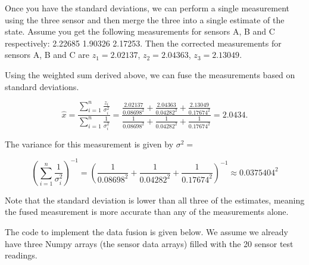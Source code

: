 Once you have the standard deviations, we can perform a single
measurement using the three sensor and then merge the three into a
single estimate of the state. Assume you get the following measurements
for sensors A, B and C respectively: 2.22685 1.90326 2.17253. Then the
corrected measurements for sensors A, B and C are \(z_1 = 2.02137\),
\(z_2 =  2.04363\), \(z_3 =  2.13049\).

Using the weighted sum derived above, we can fuse the measurements based
on standard deviations.

\[\hat{x} = \displaystyle \frac{\displaystyle \sum_{i=1}^n \frac{z_i}{\sigma_i^2}}{\displaystyle
\sum_{i=1}^n \frac{1}{\sigma_i^2}} =
\displaystyle \frac{\displaystyle  \frac{ 2.02137}{0.08698^2} + \frac{2.04363}{0.04282^2}    + \frac{2.13049}{0.17674^2}  }{\displaystyle
 \frac{ 1}{0.08698^2} + \frac{1}{0.04282^2}    + \frac{1}{0.17674^2}  } = 2.0434 .\]

The variance for this measurement is given by \(\sigma^2 =\)

\[\left(\displaystyle\sum_{i=1}^n \displaystyle \frac{1}{\sigma_i^2}\right)^{-1}
 = \left( {\displaystyle
 \frac{ 1}{0.08698^2} + \frac{1}{0.04282^2}    + \frac{1}{0.17674^2}  } \right)^{-1}
 \approx 0.0375404^2\]

Note that the standard deviation is lower than all three of the
estimates, meaning the fused measurement is more accurate than any of
the measurements alone.

The code to implement the data fusion is given below. We assume we
already have three Numpy arrays (the sensor data arrays) filled with the
20 sensor test readings.

